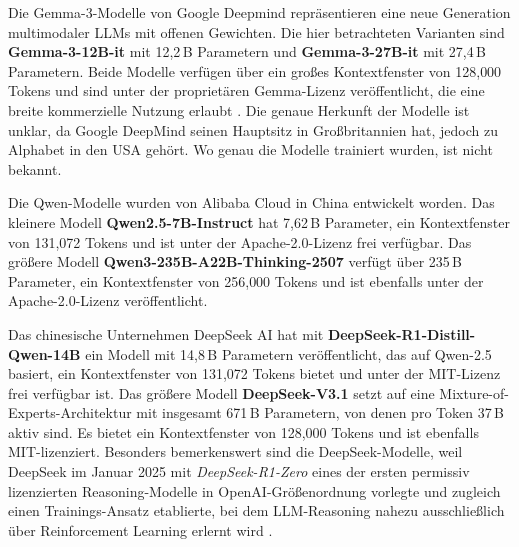 Die Gemma-3-Modelle von Google Deepmind repräsentieren eine neue Generation multimodaler \acp{LLM} mit offenen Gewichten. Die hier betrachteten Varianten sind \textbf{Gemma-3-12B-it} \cite{HF_Gemma3_12B_2025} mit 12,2\,B Parametern und \textbf{Gemma-3-27B-it} \cite{HF_Gemma3_27B_2025} mit 27,4\,B Parametern. Beide Modelle verfügen über ein großes Kontextfenster von 128{,}000 Tokens und sind unter der proprietären Gemma-Lizenz veröffentlicht, die eine breite kommerzielle Nutzung erlaubt \cite{Gemma3_License}. Die genaue Herkunft der Modelle ist unklar, da Google DeepMind seinen Hauptsitz in Großbritannien hat, jedoch zu Alphabet in den USA gehört. Wo genau die Modelle trainiert wurden, ist nicht bekannt.

Die Qwen-Modelle wurden von Alibaba Cloud in China entwickelt worden. Das kleinere Modell \textbf{Qwen2.5-7B-Instruct} \cite{HF_Qwen7B_2025} hat 7,62\,B Parameter, ein Kontextfenster von 131{,}072 Tokens und ist unter der Apache-2.0-Lizenz frei verfügbar. Das größere Modell \textbf{Qwen3-235B-A22B-Thinking-2507} \cite{HF_Qwen3_235B_2025} verfügt über 235\,B Parameter, ein Kontextfenster von 256{,}000 Tokens und ist ebenfalls unter der Apache-2.0-Lizenz veröffentlicht.

Das chinesische Unternehmen DeepSeek AI hat mit \textbf{DeepSeek-R1-Distill-Qwen-14B} \cite{HF_DeepSeekR1_Distill_Qwen14B_2025} ein Modell mit 14{,}8\,B Parametern veröffentlicht, das auf Qwen-2.5 basiert, ein Kontextfenster von 131{,}072 Tokens bietet und unter der MIT-Lizenz frei verfügbar ist. Das größere Modell \textbf{DeepSeek-V3.1} \cite{HF_DeepSeek_V3_1_2025} setzt auf eine Mixture-of-Experts-Architektur mit insgesamt 671\,B Parametern, von denen pro Token 37\,B aktiv sind. Es bietet ein Kontextfenster von 128{,}000 Tokens und ist ebenfalls MIT-lizenziert. Besonders bemerkenswert sind die DeepSeek-Modelle, weil DeepSeek im Januar 2025 mit \emph{DeepSeek-R1-Zero} \cite{HF_DeepSeekR1_Zero_2025} eines der ersten permissiv lizenzierten Reasoning-Modelle in OpenAI-Größenordnung vorlegte und zugleich einen Trainings-Ansatz etablierte, bei dem \ac{LLM}-Reasoning nahezu ausschließlich über Reinforcement Learning erlernt wird \cite{deepseekai2025deepseekr1incentivizingreasoningcapability}.

